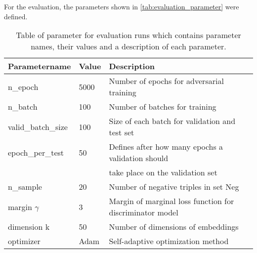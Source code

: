 For the evaluation, the parameters shown in \autoref{tab:evaluation_parameter} were defined.
\begin{table}[h]
    \centering
    \begin{tabular}{lll}
        \toprule
        
        \textbf{Parametername} & 
        \textbf{Value} & 
        \textbf{Description} \\
    
        \midrule
         n\_epoch & 5000 & Number of epochs for adversarial training\\
         n\_batch & 100 & Number of batches for training \\
         
         valid\_batch\_size & 100 & Size of each batch for validation and test set\\
         epoch\_per\_test & 50 & Defines after how many epochs a validation should \\
         &  & take place on the validation set \\
         n\_sample & 20 & Number of negative triples in set Neg \\

        margin $\gamma$ & 3 & Margin of marginal loss function for discriminator model\\
        dimension k & 50 & Number of dimensions of embeddings \\ 
        optimizer & Adam & Self-adaptive optimization method \\

        \bottomrule
    \end{tabular}
    \caption{Table of parameter for evaluation runs which contains parameter names, their values and a description of each parameter.}
\label{tab:evaluation_parameter}
\end{table}



  
  
